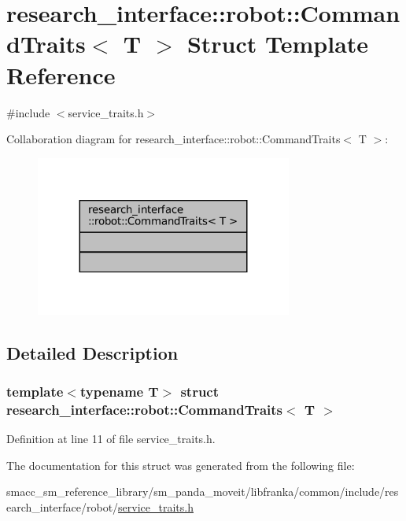 \hypertarget{structresearch__interface_1_1robot_1_1CommandTraits}{}\section{research\+\_\+interface\+:\+:robot\+:\+:Command\+Traits$<$ T $>$ Struct Template Reference}
\label{structresearch__interface_1_1robot_1_1CommandTraits}


{\ttfamily \#include $<$service\+\_\+traits.\+h$>$}



Collaboration diagram for research\+\_\+interface\+:\+:robot\+:\+:Command\+Traits$<$ T $>$\+:
\nopagebreak
\begin{figure}[H]
\begin{center}
\leavevmode
\includegraphics[width=239pt]{structresearch__interface_1_1robot_1_1CommandTraits__coll__graph}
\end{center}
\end{figure}


\subsection{Detailed Description}
\subsubsection*{template$<$typename T$>$\newline
struct research\+\_\+interface\+::robot\+::\+Command\+Traits$<$ T $>$}



Definition at line 11 of file service\+\_\+traits.\+h.



The documentation for this struct was generated from the following file\+:\begin{DoxyCompactItemize}
\item 
smacc\+\_\+sm\+\_\+reference\+\_\+library/sm\+\_\+panda\+\_\+moveit/libfranka/common/include/research\+\_\+interface/robot/\hyperlink{service__traits_8h}{service\+\_\+traits.\+h}\end{DoxyCompactItemize}

